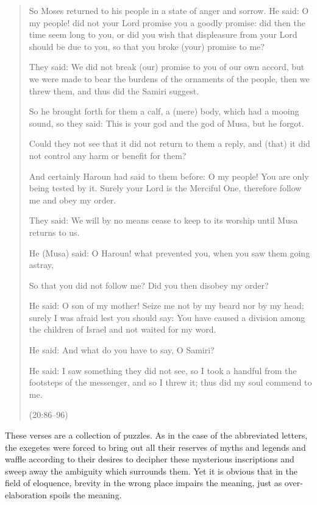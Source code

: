 \documentclass[12pt]{memoir}
\def\–{-\hskip0pt}
\newcommand{\QRef}[1]{{\color{darkblue}#1}}
\begin{document}
\begin{quote}
So Moses returned to his people in a state of anger and sorrow.
He said: O my people! did not your Lord promise you a goodly promise:
did then the time seem long to you,
or did you wish that displeasure from your Lord should be due to you,
so that you broke (your) promise to me?

They said: We did not break (our) promise to you of our own accord,
but we were made to bear the burdens of the ornaments of the people,
then we threw them, and thus did the Samiri suggest.

So he brought forth for them a calf, a (mere) body,
which had a mooing sound, so they said:
This is your god and the god of Musa, but he forgot.

Could they not see that it did not return to them a reply,
and (that) it did not control any harm or benefit for them?

And certainly Haroun had said to them before:
O my people! You are only being tested by it.
Surely your Lord is the Merciful One,
therefore follow me and obey my order.

They said: We will by no means cease to keep to its worship
until Musa returns to us.

He (Musa) said: O Haroun! what prevented you,
when you saw them going astray,

So that you did not follow me? Did you then disobey my order?

He said: O son of my mother!
Seize me not by my beard nor by my head;
surely I was afraid lest you should say:
You have caused a division among the children of Israel
and not waited for my word.

He said: And what do you have to say, O Samiri?

He said: I saw something they did not see,
so I took a handful from the footsteps of the messenger,
and so I threw it; thus did my soul commend to me.

(\QRef{20:86–96})
\end{quote}

These verses are a collection of puzzles.
As in the case of the abbreviated letters,
the exegetes were forced to bring out all their reserves of myths
and legends and waffle according to their desires to decipher
these mysterious inscriptions and sweep away the ambiguity
which surrounds them.
Yet it is obvious that in the field of eloquence,
brevity in the wrong place impairs the meaning,
just as over\–elaboration spoils the meaning.
\end{document}
